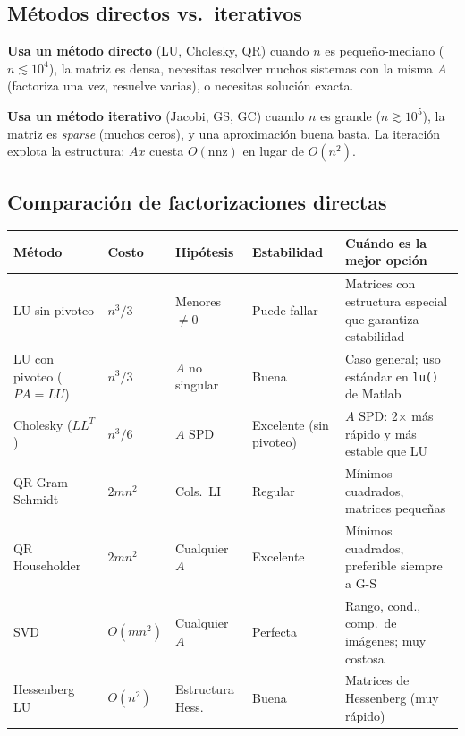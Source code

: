 \documentclass[12pt,a4paper]{article}
\begin{document}
\subsection{Métodos directos vs.\ iterativos}

\begin{resultado}
\textbf{Usa un método directo} (LU, Cholesky, QR) cuando $n$ es pequeño-mediano ($n\lesssim10^4$), la matriz es densa, necesitas resolver muchos sistemas con la misma $A$ (factoriza una vez, resuelve varias), o necesitas solución exacta.

\textbf{Usa un método iterativo} (Jacobi, GS, GC) cuando $n$ es grande ($n\gtrsim10^5$), la matriz es \emph{sparse} (muchos ceros), y una aproximación buena basta. La iteración explota la estructura: $Ax$ cuesta $O(\text{nnz})$ en lugar de $O(n^2)$.
\end{resultado}

\subsection{Comparación de factorizaciones directas}

\begin{center}
\renewcommand{\arraystretch}{1.4}
\begin{tabular}{p{2.4cm}p{2.0cm}p{2.4cm}p{2.4cm}p{4cm}}
\toprule
\textbf{Método} & \textbf{Costo} & \textbf{Hipótesis} & \textbf{Estabilidad} & \textbf{Cuándo es la mejor opción} \\
\midrule
LU sin pivoteo & $n^3/3$ & Menores $\ne0$ & Puede fallar & Matrices con estructura especial que garantiza estabilidad \\
LU con pivoteo ($PA=LU$) & $n^3/3$ & $A$ no singular & Buena & Caso general; uso estándar en \texttt{lu()} de Matlab \\
Cholesky ($LL^T$) & $n^3/6$ & $A$ SPD & Excelente (sin pivoteo) & $A$ SPD: 2× más rápido y más estable que LU \\
QR Gram-Schmidt & $2mn^2$ & Cols.\ LI & Regular & Mínimos cuadrados, matrices pequeñas \\
QR Householder & $2mn^2$ & Cualquier $A$ & Excelente & Mínimos cuadrados, preferible siempre a G-S \\
SVD & $O(mn^2)$ & Cualquier $A$ & Perfecta & Rango, cond., comp.\ de imágenes; muy costosa \\
Hessenberg LU & $O(n^2)$ & Estructura Hess. & Buena & Matrices de Hessenberg (muy rápido) \\
\bottomrule
\end{tabular}
\end{center}
\end{document}
